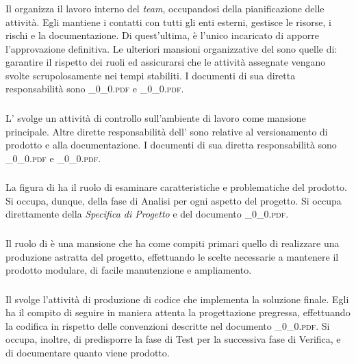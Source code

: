 		\subsubsection{\RdP}
		Il \textit{\RdP} organizza il lavoro interno del \textit{team}, occupandosi della pianificazione delle attività. Egli mantiene i contatti con tutti gli enti esterni, gestisce le risorse, i rischi e la documentazione. Di quest'ultima, è l'unico incaricato di apporre l'approvazione definitiva. Le ulteriori mansioni organizzative del \textit{\RdP} sono quelle di: garantire il rispetto dei ruoli ed assicurarsi che le attività assegnate vengano svolte scrupolosamente nei tempi stabiliti. I documenti di sua diretta responsabilità sono \textsc{\_0\_0.pdf} e \textsc{\_0\_0.pdf}.

		\subsubsection{\Amm}
		L'\textit{\Amm} svolge un attività di controllo sull'ambiente di lavoro come mansione principale. Altre dirette responsabilità dell'\textit{\Amm} sono relative al versionamento di prodotto e alla documentazione. I documenti di sua diretta responsabilità sono \textsc{\_0\_0.pdf} e \textsc{\_0\_0.pdf}.
		
		\subsubsection{\Ana}
		La figura di \textit{\Ana} ha il ruolo di esaminare caratteristiche e problematiche del prodotto. Si occupa, dunque, della fase di Analisi per ogni aspetto del progetto. Si occupa direttamente della \textit{Specifica di Progetto} e del documento \textsc{\_0\_0.pdf}.

		\subsubsection{\Prog}
		Il ruolo di \textit{\Prog} è una mansione che ha come compiti primari quello di realizzare una produzione astratta del progetto, effettuando le scelte necessarie a mantenere il prodotto modulare, di facile manutenzione e ampliamento.
		
		\subsubsection{\Progr}
		Il \textit{\Progr} svolge l'attività di produzione di codice che implementa la soluzione finale. Egli ha il compito di seguire in maniera attenta la progettazione pregressa, effettuando la codifica in rispetto delle convenzioni descritte nel documento \textsc{\_0\_0.pdf}. Si occupa, inoltre, di predisporre la fase di Test per la successiva fase di Verifica, e di documentare quanto viene prodotto.
		
